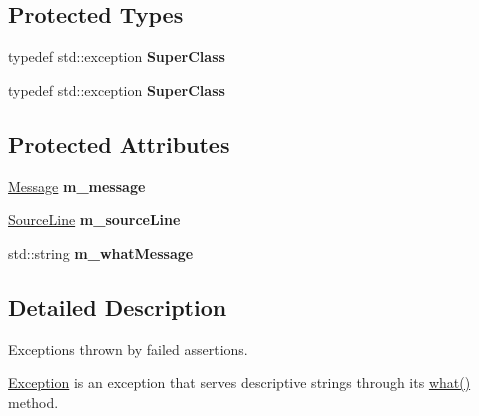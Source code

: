 \subsection*{Protected Types}
\begin{DoxyCompactItemize}
\item 
\hypertarget{class_exception_a5086086062a7ec2cfe4e609026adfbd9}{typedef std\+::exception {\bfseries Super\+Class}}\label{class_exception_a5086086062a7ec2cfe4e609026adfbd9}

\item 
\hypertarget{class_exception_a5086086062a7ec2cfe4e609026adfbd9}{typedef std\+::exception {\bfseries Super\+Class}}\label{class_exception_a5086086062a7ec2cfe4e609026adfbd9}

\end{DoxyCompactItemize}
\subsection*{Protected Attributes}
\begin{DoxyCompactItemize}
\item 
\hypertarget{class_exception_ad77e1fcf64ced674e60e1d9195c634df}{\hyperlink{class_message}{Message} {\bfseries m\+\_\+message}}\label{class_exception_ad77e1fcf64ced674e60e1d9195c634df}

\item 
\hypertarget{class_exception_ae6685340e219cdcef0d72d45b58c5efb}{\hyperlink{class_source_line}{Source\+Line} {\bfseries m\+\_\+source\+Line}}\label{class_exception_ae6685340e219cdcef0d72d45b58c5efb}

\item 
\hypertarget{class_exception_a51b947da686ab2dd290f799b2a05d492}{std\+::string {\bfseries m\+\_\+what\+Message}}\label{class_exception_a51b947da686ab2dd290f799b2a05d492}

\end{DoxyCompactItemize}


\subsection{Detailed Description}
Exceptions thrown by failed assertions.

\hyperlink{class_exception}{Exception} is an exception that serves descriptive strings through its \hyperlink{class_exception_a380f0477d9ef319911e7a8167bd47f1f}{what()} method. 

